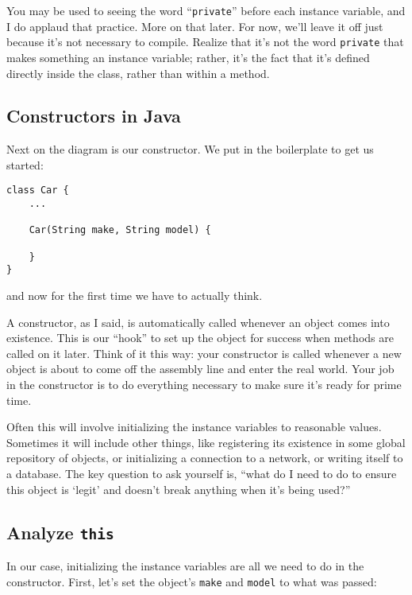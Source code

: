 You may be used to seeing the word ``\texttt{private}'' before each instance
variable, and I do applaud that practice. More on that later. For now, we'll
leave it off just because it's not necessary to compile. Realize that it's not
the word \texttt{private} that makes something an instance variable; rather,
it's the fact that it's defined directly inside the class, rather than within
a method.

\subsection{Constructors in Java}

Next on the diagram is our constructor. We put in the boilerplate to get us
started:

\begin{Verbatim}[samepage=true,fontsize=\footnotesize,frame=single]
class Car {
    ...

    Car(String make, String model) {

    }
}
\end{Verbatim}

and now for the first time we have to actually think.

A constructor, as I said, is automatically called whenever an object comes
into existence. This is our ``hook'' to set up the object for success when
methods are called on it later. Think of it this way: your constructor is
called whenever a new object is about to come off the assembly line and enter
the real world. Your job in the constructor is to do everything necessary to
make sure it's ready for prime time.

Often this will involve initializing the instance variables to reasonable
values. Sometimes it will include other things, like registering its existence
in some global repository of objects, or initializing a connection to a
network, or writing itself to a database. The key question to ask yourself is,
``what do I need to do to ensure this object is `legit' and doesn't break
anything when it's being used?''

\subsection{Analyze \texttt{this}}

In our case, initializing the instance variables are all we need to do in the
constructor. First, let's set the object's \texttt{make} and \texttt{model} to
what was passed:

